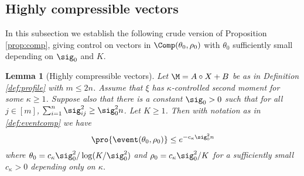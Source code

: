 \documentclass[aop,preprint]{imsart}
\theoremstyle{plain}
\newtheorem{lemma}[theorem]{Lemma}
\theoremstyle{definition}
\theoremstyle{remark}
\numberwithin{equation}{section}
\numberwithin{theorem}{section}
\begin{document}
\begin{comment}
\Red{Either shorten this or the intro to the section}
The remainder of this section is organized as follows.
In Section \ref{sec:high} we apply Corollary \ref{cor:net} and the crude anti-concentration bound of Lemma \ref{lem:anti_crude}
to obtain a crude form of Proposition \ref{prop:comp} (which also applies to matrices as in Proposition \ref{prop:slight}).
In Section \ref{sec:entropy} we present a key technical result, Lemma \ref{lem:entropy}, which allows one to control the invertibility of a random matrix over a portion of the sphere using a random net of small cardinality, assuming one already has some control over compressible vectors.
In the remaining sections Lemma \ref{lem:entropy} is applied with the improved anti-concentration estimate of Lemma \ref{lem:anti_improved} in an iterative argument to upgrade the crude control from Lemma \ref{lem:high} to obtain Propositions \ref{prop:slight} and \ref{prop:comp}.
\end{comment}

\subsection{Highly compressible vectors}		\label{sec:high}

In this subsection we establish the following crude version of Proposition \ref{prop:comp}, giving control on vectors in $\Comp(\theta_0,\rho_0)$ with $\theta_0$ sufficiently small depending on $\sig_0$ and $K$.

\begin{lemma}[Highly compressible vectors]	\label{lem:high}
Let $\M=A\circ X+B$ be as in Definition \ref{def:profile} with $m\le 2n$.
Assume that $\xi$ has $\kappa$-controlled second moment for some $\kappa\ge1$.
Suppose also that there is a constant $\sig_0>0$ such that for all $j\in [m]$, $\sum_{i=1}^n \sig_{ij}^2 \ge \sig_0^2n$.
Let $K\ge 1$.
Then with notation as in \eqref{def:eventcomp} we have
\begin{equation}
\pro{ \event(\theta_0,\rho_0)} \le e^{-c_\kappa\sig_0^2n}
\end{equation}
where $\theta_0= c_\kappa\sig_0^2 /\log(K/\sig_0^2)$ and $\rho_0=c_\kappa\sig_0^2/K$ for a sufficiently small $c_\kappa>0$ depending only on $\kappa$.
\end{lemma}
\end{document}
